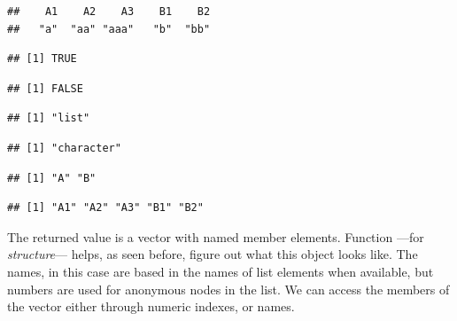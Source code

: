 \documentclass[krantz2]{krantz}\usepackage{knitr}%
\begin{document}
\begin{knitrout}\footnotesize
{}\color{fgcolor}\begin{kframe}
\begin{alltt}
 \hlkwb{<-} 
\end{alltt}
\begin{verbatim}
##    A1    A2    A3    B1    B2 
##   "a"  "aa" "aaa"   "b"  "bb"
\end{verbatim}
\begin{alltt}
\end{alltt}
\begin{verbatim}
## [1] TRUE
\end{verbatim}
\begin{alltt}
\end{alltt}
\begin{verbatim}
## [1] FALSE
\end{verbatim}
\begin{alltt}
\end{alltt}
\begin{verbatim}
## [1] "list"
\end{verbatim}
\begin{alltt}
\end{alltt}
\begin{verbatim}
## [1] "character"
\end{verbatim}
\begin{alltt}
\end{alltt}
\begin{verbatim}
## [1] "A" "B"
\end{verbatim}
\begin{alltt}
\end{alltt}
\begin{verbatim}
## [1] "A1" "A2" "A3" "B1" "B2"
\end{verbatim}
\end{kframe}
\end{knitrout}

The returned value is a vector with named member elements. Function ---for \emph{structure}--- helps, as seen before, figure out what this object looks like. The names, in this case are based in the names of list elements when available, but numbers are used for anonymous nodes in the list. We can access the members of the vector either through numeric indexes, or names.
\end{document}
